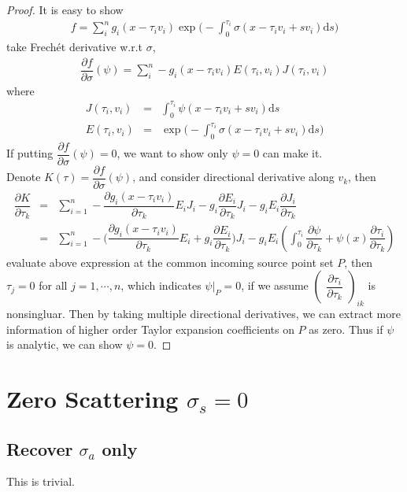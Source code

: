 \documentclass[12pt,a4paper]{article}
\begin{document}
\begin{proof}
It is easy to show 
\begin{eqnarray}
f = \sum_i^n g_i(x - \tau_i v_i) \exp\Big(-\int_0^{\tau_i} \sigma(x-\tau_i v_i + sv_i)\mathrm{d}s\Big)
\end{eqnarray}
take Frech\'{e}t derivative w.r.t $\sigma$,
\begin{eqnarray}
\dfrac{\partial f}{\partial \sigma}(\psi) =\sum_i^n -g_i(x - \tau_i v_i)E(\tau_i,v_i)J(\tau_i,v_i)
\end{eqnarray}
where
\begin{eqnarray}
J(\tau_i,v_i) &=& \int_0^{\tau_i} \psi(x-\tau_i v_i + sv_i)\mathrm{d}s \\ 
E(\tau_i,v_i) &=&  \exp\Big(-\int_0^{\tau_i} \sigma(x-\tau_i v_i + sv_i)\mathrm{d}s\Big)
\end{eqnarray}
If putting $\dfrac{\partial f}{\partial \sigma}(\psi) = 0$, we want to show only $\psi =0$ can make it.
\\
Denote $K(\tau) = \dfrac{\partial f}{\partial \sigma}(\psi)$, and consider directional derivative along $v_k$, then
\begin{eqnarray}
\dfrac{\partial K}{\partial \tau_k} &=& \sum_{i=1}^n -\dfrac{\partial g_i(x-\tau_i v_i)}{\partial \tau_k}E_i J_i -g_i\dfrac{\partial E_i}{\partial \tau_k} J_i - g_iE_i\dfrac{\partial J_i}{\partial\tau_k}\\
&=& \sum_{i=1}^n -\Big(\dfrac{\partial g_i(x-\tau_i v_i)}{\partial \tau_k}E_i + g_i\dfrac{\partial E_i}{\partial \tau_k}  \Big) J_i - g_iE_i\left(\int_0^{\tau_i}\dfrac{\partial \psi}{\partial \tau_k} + \psi(x)\dfrac{\partial \tau_i}{\partial \tau_k}\right)\nonumber
\end{eqnarray}
evaluate above expression at the common incoming source point set $P$, then $\tau_j = 0$ for all $j=1,\cdots,n$, which indicates $\psi|_P = 0$, if we assume 
$
{\begin{pmatrix}
\dfrac{\partial \tau_i}{\partial \tau_k}
\end{pmatrix}}_{ik}
$ is nonsingluar. Then by taking multiple directional derivatives, we can extract more information of higher order Taylor expansion coefficients on $P$ as zero. Thus if $\psi$ is analytic, we can show $\psi = 0$.
\end{proof}
\section{Zero Scattering $\sigma_s = 0$}
\subsection{Recover $\sigma_a$ only}
This is trivial.
\end{document}
